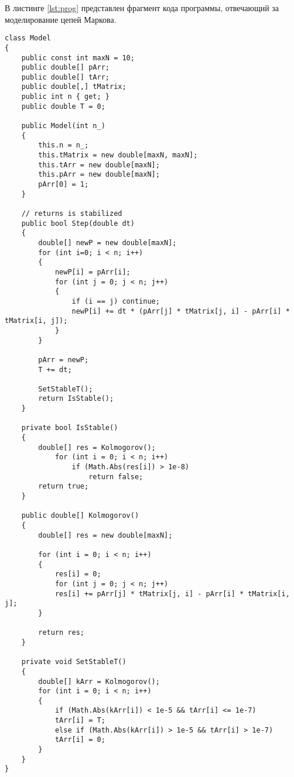 В листинге \ref{lst:prog} представлен фрагмент кода программы, отвечающий за моделирование цепей Маркова.

\begin{lstlisting}[caption = {Вычисление функций распредлений}, label=lst:prog]
class Model
{
	public const int maxN = 10;
	public double[] pArr;
	public double[] tArr;
	public double[,] tMatrix;
	public int n { get; }
	public double T = 0;
	
	public Model(int n_)
	{
		this.n = n_;
		this.tMatrix = new double[maxN, maxN];
		this.tArr = new double[maxN];
		this.pArr = new double[maxN];
		pArr[0] = 1;
	}
	
	// returns is stabilized
	public bool Step(double dt)
	{
		double[] newP = new double[maxN];
		for (int i=0; i < n; i++)
		{
			newP[i] = pArr[i];
			for (int j = 0; j < n; j++)
			{
				if (i == j) continue;
				newP[i] += dt * (pArr[j] * tMatrix[j, i] - pArr[i] * tMatrix[i, j]);
			}
		}
				
		pArr = newP;
		T += dt;
		
		SetStableT();
		return IsStable();
	}
	
	private bool IsStable()
	{
		double[] res = Kolmogorov();
			for (int i = 0; i < n; i++)
				if (Math.Abs(res[i]) > 1e-8)
					return false;
		return true;
	}
	
	public double[] Kolmogorov()
	{
		double[] res = new double[maxN];
		
		for (int i = 0; i < n; i++)
		{
			res[i] = 0;
			for (int j = 0; j < n; j++)
			res[i] += pArr[j] * tMatrix[j, i] - pArr[i] * tMatrix[i, j];
		}
		
		return res;
	}
	
	private void SetStableT()
	{
		double[] kArr = Kolmogorov();
		for (int i = 0; i < n; i++)
		{
			if (Math.Abs(kArr[i]) < 1e-5 && tArr[i] <= 1e-7)
			tArr[i] = T;
			else if (Math.Abs(kArr[i]) > 1e-5 && tArr[i] > 1e-7)
			tArr[i] = 0;
		}
	}
}
\end{lstlisting}
